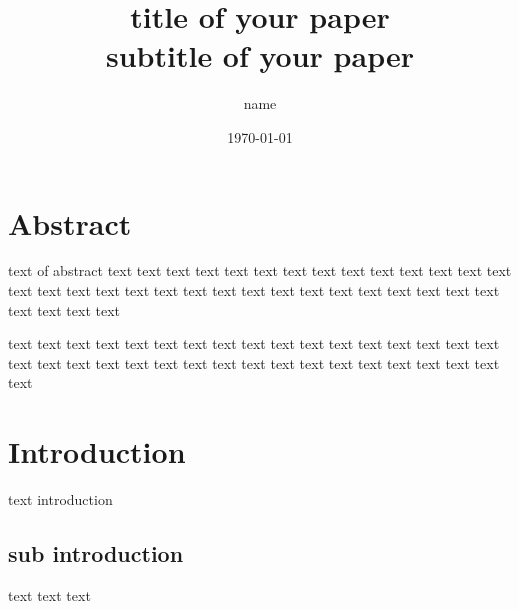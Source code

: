 \documentclass[10pt, a4paper, titlepage]{article}
\title{title of your paper\\ \small subtitle of your paper}
\author{name}
\date{\today}
\begin{document}
\maketitle
\newpage

\section*{Abstract}

text of abstract text text text text text text text text text text text text text text text text text text text text text text text text text text text text text text text text text text text 

text text text text text text text text text text text text text text text text text text text text text text text text text text text text text text text text text text text

\section{Introduction}
text introduction

\subsection{sub introduction}
text text text
\end{document}
